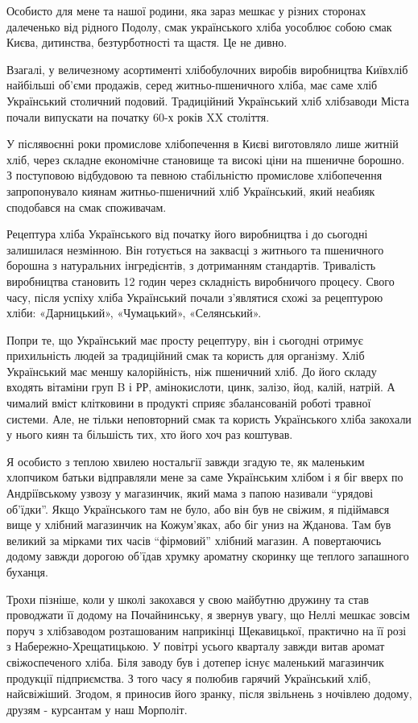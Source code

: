 Особисто для мене та нашої родини, яка зараз мешкає у різних сторонах
далеченько від рідного Подолу, смак українського хліба уособлює собою смак
Києва, дитинства, безтурботності та щастя. Це не дивно. 

Взагалі, у величезному асортименті
хлібобулочних виробів виробництва Київхліб найбільші об’єми продажів,  серед
житньо-пшеничного хліба, має саме хліб Український столичний подовий.
Традиційний Український хліб хлібзаводи Міста почали випускати на початку 60-х
років XX століття. 

У післявоєнні роки промислове хлібопечення в Києві
виготовляло лише житній хліб, через складне економічне становище та високі ціни
на пшеничне борошно. З поступовою відбудовою та певною стабільністю промислове
хлібопечення запропонувало киянам житньо-пшеничний хліб Український, який
неабияк сподобався на смак споживачам. 

Рецептура хліба Українського від початку його виробництва і до сьогодні
залишилася незмінною. Він готується на заквасці з житнього та пшеничного
борошна з натуральних інгредієнтів, з дотриманням стандартів.  Тривалість
виробництва становить 12 годин через складність виробничого процесу. Свого
часу, після успіху хліба Український почали з’являтися схожі за рецептурою
хліби: «Дарницький», «Чумацький», «Селянський».

Попри те, що Український має просту рецептуру, він і сьогодні отримує
прихильність людей за традиційний смак та користь для організму. Хліб
Український має меншу калорійність, ніж пшеничний хліб. До його складу входять
вітаміни груп B і РР, амінокислоти, цинк, залізо, йод, калій, натрій. А чималий
вміст клітковини в продукті сприяє збалансованій роботі травної системи. Але,
не тільки неповторний смак та користь Українського хліба закохали у нього киян
та більшість тих, хто його хоч раз коштував. 

Я особисто з теплою хвилею
ностальгії завжди згадую те, як маленьким хлопчиком батьки відправляли мене за
саме Українським хлібом і я біг вверх по Андріївському узвозу у магазинчик,
який мама з папою називали \enquote{урядові об'їдки}. Якщо Українського там не було,
або він був не свіжим, я підіймався вище у хлібний магазинчик на Кожум'яках,
або біг униз на Жданова. Там був великий за мірками тих часів \enquote{фірмовий}
хлібний магазин. А повертаючись додому завжди дорогою об'їдав хрумку ароматну
скоринку ще теплого запашного буханця. 

Трохи пізніше, коли у школі закохався у свою майбутню дружину та став
проводжати її додому на Почайнинську, я звернув увагу, що Неллі мешкає зовсім
поруч з хлібзаводом розташованим наприкінці Щекавицької, практично на її розі з
Набережно-Хрещатицькою. У повітрі усього кварталу завжди витав аромат
свіжоспеченого хліба. Біля заводу був і дотепер існує маленький магазинчик
продукції підприємства. З того часу я полюбив гарячий Український хліб,
найсвіжіший. Згодом, я приносив його зранку, після звільнень з ночівлею додому,
друзям - курсантам у наш Морполіт. 

